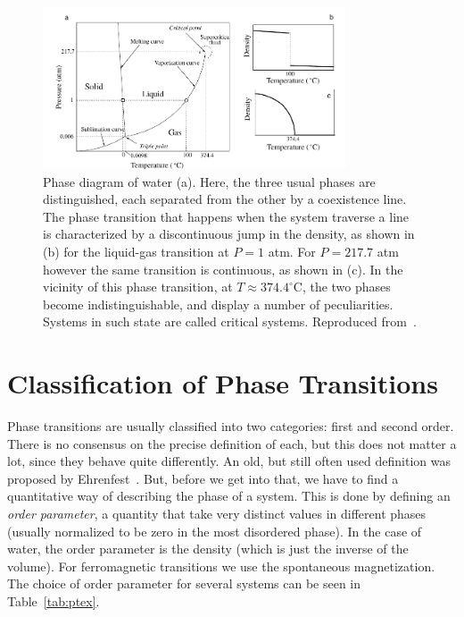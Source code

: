 \begin{figure}[t]
\begin{center}
    \includegraphics[width=0.8\textwidth]{chapters/ch2-crit/figs/water}
\end{center}
\caption{Phase diagram of water (a). Here, the three usual phases are
    distinguished, each separated from the other by a coexistence line. The
    phase transition that happens when the system traverse a line is
    characterized by a discontinuous jump in the density, as shown in (b) for
    the liquid-gas transition at $P=1$ atm. For $P=217.7$ atm however the same
    transition is continuous, as shown in (c). In the vicinity of this phase
    transition, at $T\approx374.4^\circ$C, the two phases become
    indistinguishable, and display a number of peculiarities. Systems in such
    state are called critical systems. Reproduced from~\cite{Sole2011}.}
\label{fig:water}
\end{figure}


\section{Classification of Phase Transitions}
\label{sec:classification}

Phase transitions are usually classified into two categories: first and second
order. There is no consensus on the precise definition of each, but this does
not matter a lot, since they behave quite differently. An old, but still often
used definition was proposed by Ehrenfest~\cite{Jaeger1998}. But, before we get
into that, we have to find a quantitative way of describing the phase of a
system. This is done by defining an \textit{order parameter}, a quantity that
take very distinct values in different phases (usually normalized to be zero in
the most disordered phase). In the case of water, the order parameter is the
density (which is just the inverse of the volume). For ferromagnetic
transitions we use the spontaneous magnetization. The choice of order parameter
for several systems can be seen in Table~\ref{tab:ptex}.

